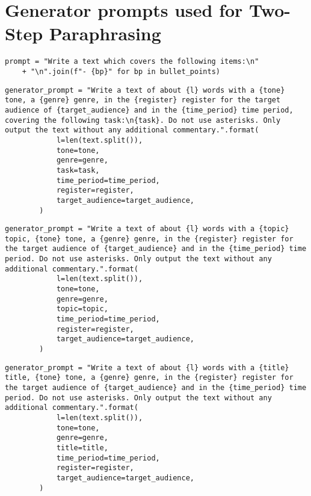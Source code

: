 \section{Generator prompts used for Two-Step Paraphrasing}
\label{app:generator_prompts}
\begin{verbatim}
prompt = "Write a text which covers the following items:\n" 
    + "\n".join(f"- {bp}" for bp in bullet_points)
\end{verbatim}

\begin{verbatim}
generator_prompt = "Write a text of about {l} words with a {tone} tone, a {genre} genre, in the {register} register for the target audience of {target_audience} and in the {time_period} time period, covering the following task:\n{task}. Do not use asterisks. Only output the text without any additional commentary.".format(
            l=len(text.split()),
            tone=tone,
            genre=genre,
            task=task,
            time_period=time_period,
            register=register,
            target_audience=target_audience,
        )
\end{verbatim}

\begin{verbatim}
generator_prompt = "Write a text of about {l} words with a {topic} topic, {tone} tone, a {genre} genre, in the {register} register for the target audience of {target_audience} and in the {time_period} time period. Do not use asterisks. Only output the text without any additional commentary.".format(
            l=len(text.split()),
            tone=tone,
            genre=genre,
            topic=topic,
            time_period=time_period,
            register=register,
            target_audience=target_audience,
        )
\end{verbatim}

\begin{verbatim}
generator_prompt = "Write a text of about {l} words with a {title} title, {tone} tone, a {genre} genre, in the {register} register for the target audience of {target_audience} and in the {time_period} time period. Do not use asterisks. Only output the text without any additional commentary.".format(
            l=len(text.split()),
            tone=tone,
            genre=genre,
            title=title,
            time_period=time_period,
            register=register,
            target_audience=target_audience,
        )
\end{verbatim}

